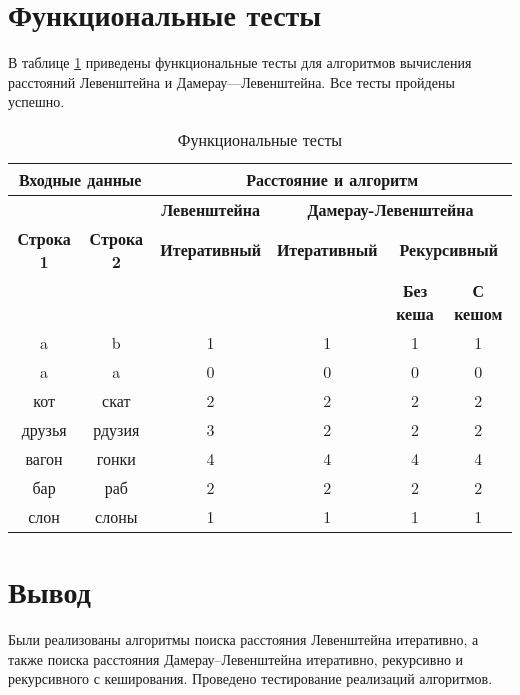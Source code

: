 \clearpage

\section{Функциональные тесты}

В таблице \ref{tbl:func_tests} приведены функциональные тесты для алгоритмов вычисления расстояний Левенштейна и Дамерау—Левенштейна. Все тесты пройдены успешно.

\begin{table}[ht]
	\small
	\begin{center}
		\begin{threeparttable}
		\caption{Функциональные тесты}
		\label{tbl:func_tests}
		\begin{tabular}{|c|c|c|c|c|c|}
			\hline
			\multicolumn{2}{|c|}{\bfseries Входные данные}
			& \multicolumn{4}{c|}{\bfseries Расстояние и алгоритм} \\ 
			\hline 
			&
			& \multicolumn{1}{c|}{\bfseries Левенштейна} 
			& \multicolumn{3}{c|}{\bfseries Дамерау-Левенштейна} \\ \cline{3-6}
			
			\bfseries Строка 1 & \bfseries Строка 2 & \bfseries Итеративный & \bfseries Итеративный
			
			& \multicolumn{2}{c|}{\bfseries Рекурсивный} \\ \cline{5-6}
			& & & & \bfseries Без кеша & \bfseries С кешом \\
			\hline
			a & b & 1 & 1 & 1 & 1 \\
			\hline
			a & a & 0 & 0 & 0 & 0 \\
			\hline
			кот & скат & 2 & 2 & 2 & 2 \\
			\hline
			друзья & рдузия & 3 & 2 & 2 & 2 \\
			\hline
			вагон & гонки & 4 & 4 & 4 & 4 \\
			\hline
			бар & раб & 2 & 2 & 2 & 2 \\
			\hline
			слон & слоны & 1 & 1 & 1 & 1 \\
			\hline
		\end{tabular}	
		\end{threeparttable}
	\end{center}
\end{table}

\section*{Вывод}

Были реализованы алгоритмы поиска расстояния Левенштейна итеративно, а также поиска расстояния Дамерау–Левенштейна итеративно, рекурсивно и рекурсивного с кеширования. Проведено тестирование реализаций алгоритмов.
